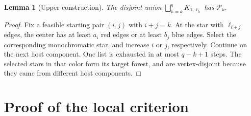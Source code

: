 \documentclass[11pt]{article}
\newtheorem{lemma}[theorem]{Lemma}
\theoremstyle{remark}\newtheorem{remark}[theorem]{Remark}
\begin{document}
\begin{lemma}[Upper construction]\label{lem:upper}
The disjoint union $\bigsqcup_{h=k}^qK_{1,\ell_h}$ has $\mathcal P_k$.
\end{lemma}
\begin{proof}
Fix a feasible starting pair $(i,j)$ with $i+j=k$. At the star with $\ell_{i+j}$ edges, the center has at least $a_i$ red edges or at least $b_j$ blue edges. Select the corresponding monochromatic star, and increase $i$ or $j$, respectively. Continue on the next host component. One list is exhausted in at most $q-k+1$ steps. The selected stars in that color form its target forest, and are vertex-disjoint because they came from different host components.
\end{proof}

\section{Proof of the local criterion}
\end{document}
